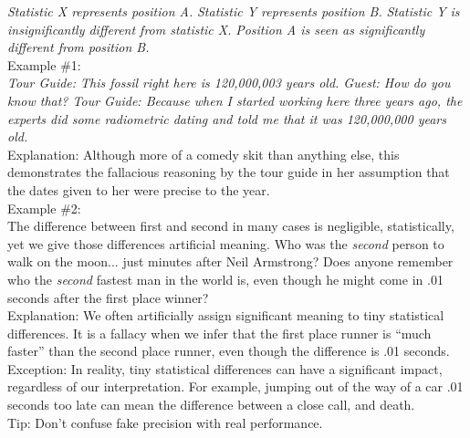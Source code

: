 \documentclass[a4paper,12pt,single,pdftex]{scrbook}
\begin{document}
    
      {\em Statistic X represents position A.} \newline
{\em Statistic Y represents position B.} \newline
{\em Statistic Y is insignificantly different from statistic X.} \newline
{\em Position A is seen as significantly different from position B.}
    \\

    
      Example \#1:
    \\

    
      {\em Tour Guide: This fossil right here is 120,000,003 years old. \newline
Guest: How do you know that? \newline
Tour Guide: Because when I started working here three years ago, the experts did some radiometric dating and told me that it was 120,000,000 years old.}
    \\

    
      Explanation: Although more of a comedy skit than anything else, this demonstrates the fallacious reasoning by the tour guide in her assumption that the dates given to her were precise to the year.
    \\

    
      Example \#2: 
    \\

    
      The difference between first and second in many cases is negligible, statistically, yet we give those differences artificial meaning.  Who was the {\it second} person to walk on the moon... just minutes after Neil Armstrong?  Does anyone remember who the {\it second}  fastest man in the world is, even though he might come in .01 seconds after the first place winner?
    \\

    
      Explanation:  We often artificially assign significant meaning to tiny statistical differences.  It is a fallacy when we infer that the first place runner is “much faster” than the second place runner, even though the difference is .01 seconds.
    \\

    
      Exception: In reality, tiny statistical differences can have a significant impact, regardless of our interpretation.  For example, jumping out of the way of a car .01 seconds too late can mean the difference between a close call, and death.
    \\

    
      Tip: Don’t confuse fake precision with real performance.
    \\
\end{document}
